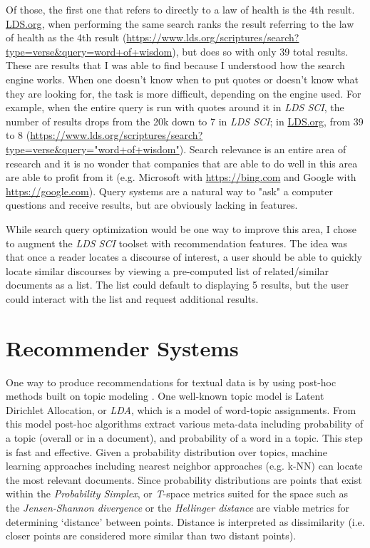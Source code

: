 Of those, the first one that refers to directly to a law of health is the 4th result. \url{LDS.org}, when performing the same search ranks the result referring to the law of health as the 4th result (\url{https://www.lds.org/scriptures/search?type=verse&query=word+of+wisdom}), but does so with only 39 total results. These are results that I was able to find because I understood how the search engine works. When one doesn’t know when to put quotes or doesn’t know what they are looking for, the task is more difficult, depending on the engine used. For example, when the entire query is run with quotes around it in \emph{LDS SCI}, the number of results drops from the 20k down to 7 in \emph{LDS SCI}; in \url{LDS.org}, from 39 to 8 (\url{https://www.lds.org/scriptures/search?type=verse&query="word+of+wisdom"}). Search relevance is an entire area of research and it is no wonder that companies that are able to do well in this area are able to profit from it (e.g. Microsoft with \url{https://bing.com} and Google with \url{https://google.com}). Query systems are a natural way to "ask" a computer questions and receive results, but are obviously lacking in features.

While search query optimization would be one way to improve this area, I chose to augment the \emph{LDS SCI} toolset with recommendation features. The idea was that once a reader locates a discourse of interest, a user should be able to quickly locate similar discourses by viewing a pre-computed list of related/similar documents as a list. The list could default to displaying 5 results, but the user could interact with the list and request additional results. %


\section{Recommender Systems}

One way to produce recommendations for textual data is by using post-hoc methods built on topic modeling \citep{blei2012probabilistic}. One well-known topic model is Latent Dirichlet Allocation, or \emph{LDA}, which is a model of word-topic assignments. From this model post-hoc algorithms extract various meta-data including probability of a topic (overall or in a document), and probability of a word in a topic. This step is fast and effective. Given a probability distribution over topics, machine learning approaches including nearest neighbor approaches (e.g. k-NN) can locate the most relevant documents. Since probability distributions are points that exist within the \emph{Probability Simplex}, or \textit{T}-space \citep{Krstovski2013efficient} metrics suited for the space such as the \emph{Jensen-Shannon divergence} or the \emph{Hellinger distance} are viable metrics for determining `distance' between points. Distance is interpreted as dissimilarity (i.e. closer points are considered more similar than two distant points).

